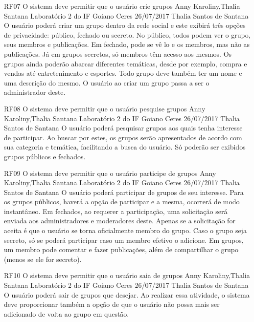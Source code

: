  \requisitoFuncional
 {RF07}
 {O sistema deve permitir que o usuário crie grupos}
 {Anny Karoliny,Thalia Santana}
 {Laboratório 2 do IF Goiano Ceres}
 {26/07/2017}
 {Thalia Santos de Santana}
 {O usuário poderá criar um grupo dentro da rede social e este exibirá três opções de privacidade: público, fechado ou secreto. No público, todos podem ver o grupo, seus membros e publicações. Em fechado, pode se vê lo e os membros, mas não as publicações. Já em grupos secretos, só membros têm acesso aos mesmos. Os grupos ainda poderão abarcar diferentes temáticas, desde por exemplo, compra e vendas até entretenimento e esportes. Todo grupo deve também ter um nome e uma descrição do mesmo. O usuário ao criar um grupo passa a ser o administrador deste.
 }
 
 \requisitoFuncional
 {RF08}
 {O sistema deve permitir que o usuário pesquise grupos}
 {Anny Karoliny,Thalia Santana}
 {Laboratório 2 do IF Goiano Ceres}
 {26/07/2017}
 {Thalia Santos de Santana}
 {O usuário poderá pesquisar grupos aos quais tenha interesse de participar. Ao buscar por estes, os grupos serão apresentados de acordo com sua categoria e temática, facilitando a busca do usuário. Só poderão ser exibidos grupos públicos e fechados.
 }
 
 \requisitoFuncional
 {RF09}
 {O sistema deve permitir que o usuário participe de grupos}
 {Anny Karoliny,Thalia Santana}
 {Laboratório 2 do IF Goiano Ceres}
 {26/07/2017}
 {Thalia Santos de Santana}
 {O usuário poderá participar de grupos de seu interesse. Para os grupos públicos, haverá a opção de participar e a mesma,  ocorrerá de modo instantâneo. Em fechados, ao requerer a participação, uma solicitação será enviada aos administradores e moderadores deste. Apenas se a solicitação for aceita é que o usuário se torna oficialmente membro do grupo. Caso o grupo seja secreto, só se poderá participar caso um membro efetivo o adicione.  Em grupos, um membro pode comentar e fazer publicações, além de compartilhar o grupo (menos se ele for secreto).
 }
 
 \requisitoFuncional
 {RF10}
 {O sistema deve permitir que o usuário saia de grupos}
 {Anny Karoliny,Thalia Santana}
 {Laboratório 2 do IF Goiano Ceres}
 {26/07/2017}
 {Thalia Santos de Santana}
 {O usuário poderá sair de grupos que desejar. Ao realizar essa atividade, o sistema deve proporcionar também a opção de que o usuário não possa mais ser adicionado de volta ao grupo em questão.
 }
 
